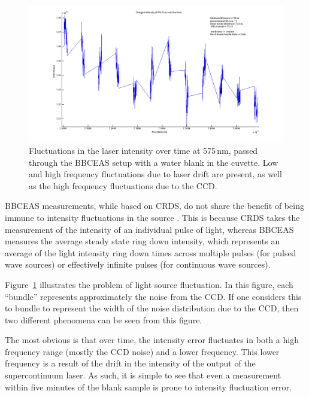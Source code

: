 \begin{figure}[h!]
\begin{center}
\includegraphics[width=\textwidth]{figures/change_in_intensity_of_576_5nm_over_one_hour.png}
\end{center}
\caption{Fluctuations in the laser intensity over time at 575\,nm, passed through the \ac{BBCEAS} setup with a water blank in the cuvette. Low and high frequency fluctuations due to laser drift are present, as well as the high frequency fluctuations due to the \ac{CCD}.}
\label{fig:laser_fluc}
\end{figure}

\ac{BBCEAS} measurements, while based on \ac{CRDS}, do not share the benefit of
being immune to intensity fluctuations in the source \cite{Berden:2009wk}. This
is because \ac{CRDS} takes the measurement of the intensity of an individual
pulse of light, whereas \ac{BBCEAS} measures the average steady state ring down
intensity, which represents an average of the light intensity ring down times
across multiple pulses (for pulsed wave sources) or effectively infinite pulses
(for continuous wave sources).

Figure~\ref{fig:laser_fluc} illustrates the problem of light source
fluctuation. In this figure, each ``bundle'' represents approximately the
noise from the \ac{CCD}. If one considers this to bundle to represent the
width of the noise distribution due to the \ac{CCD}, then two different
phenomena can be seen from this figure.

The most obvious is that over time, the intensity error fluctuates in both a
high frequency range (mostly the \ac{CCD} noise) and a lower frequency. This
lower frequency is a result of the drift in the intensity of the output of the
supercontinuum laser. As such, it is simple to see that even a measurement
within five minutes of the blank sample is prone to intensity fluctuation
error.

